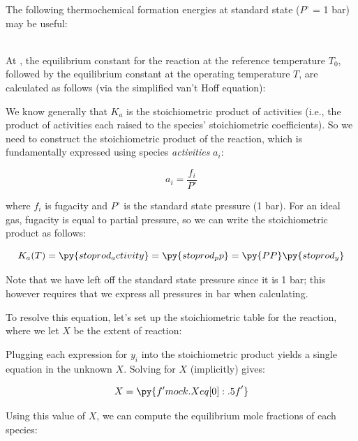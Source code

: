 The following thermochemical formation energies at standard state ($P^\circ$ = 1 bar) may be useful:

\begin{center}
\end{center}

\ifshowsolutions\vspace{1em}\Solutionheader\\

At , the equilibrium constant for the reaction at the reference temperature $T_0$, followed by the equilibrium constant at the operating temperature $T$, are calculated as follows (via the simplified van't Hoff equation):


We know generally that $K_a$ is the stoichiometric product of activities (i.e., the product of activities each raised to the species' stoichiometric coefficients). So we need to construct the stoichiometric product of the reaction, which is fundamentally expressed using species {\em activities} $a_i$:

\[
a_i = \frac{f_i}{P^\circ}
\]

where $f_i$ is fugacity and $P^\circ$ is the standard state pressure (1 bar).  For an ideal gas, fugacity is equal to partial pressure, so we can write the stoichiometric product as follows:

\[
K_a(T) = \py{stoprod_activity} = \py{stoprod_pp} = \py{PP}\py{stoprod_y}
\]

Note that we have left off the standard state pressure since it is 1 bar; this however requires that we express all pressures in bar when calculating.

To resolve this equation, let's set up the stoichiometric table for the reaction, where we let $X$ be the extent of reaction:


Plugging each expression for $y_i$ into the stoichiometric product yields a single equation in the unknown $X$. Solving for $X$ (implicitly) gives:

\[
X = \py{f'{mock.Xeq[0]:.5f}'}
\]

Using this value of $X$, we can compute the equilibrium mole fractions of each species:

\begin{center}
\end{center}

\clearpage
\fi

